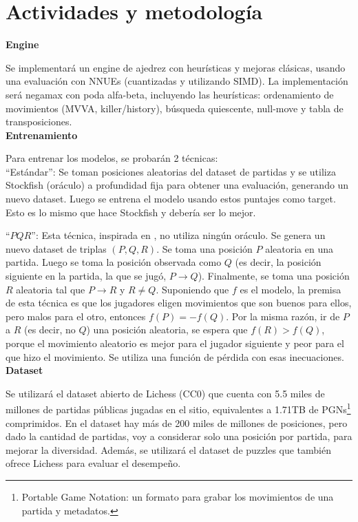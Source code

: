 \newpage
\section*{Actividades y metodología}

\textbf{Engine}

Se implementará un engine de ajedrez con heurísticas y mejoras clásicas, usando una evaluación con NNUEs (cuantizadas y utilizando SIMD). La implementación será negamax con poda alfa-beta, incluyendo las heurísticas: ordenamiento de movimientos (MVVA, killer/history), búsqueda quiescente, null-move y tabla de transposiciones. \\

\textbf{Entrenamiento}

Para entrenar los modelos, se probarán 2 técnicas: \\

``Estándar'': Se toman posiciones aleatorias del dataset de partidas y se utiliza Stockfish (oráculo) a profundidad fija para obtener una evaluación, generando un nuevo dataset. Luego se entrena el modelo usando estos puntajes como target. Esto es lo mismo que hace Stockfish y debería ser lo mejor.

``$PQR$'': Esta técnica, inspirada en \cite{dlchess:2014}, no utiliza ningún oráculo. Se genera un nuevo dataset de triplas $(P,Q,R)$. Se toma una posición $P$ aleatoria en una partida. Luego se toma la posición observada como $Q$ (es decir, la posición siguiente en la partida, la que se jugó, $P \rightarrow Q$). Finalmente, se toma una posición $R$ aleatoria tal que $P \rightarrow R$ y $R \neq Q$. Suponiendo que $f$ es el modelo, la premisa de esta técnica es que los jugadores eligen movimientos que son buenos para ellos, pero malos para el otro, entonces $f(P)=-f(Q)$. Por la misma razón, ir de $P$ a $R$ (es decir, no $Q$) una posición aleatoria, se espera que $f(R) > f(Q)$, porque el movimiento aleatorio es mejor para el jugador siguiente y peor para el que hizo el movimiento. Se utiliza una función de pérdida con esas inecuaciones. \\


\textbf{Dataset}

Se utilizará el dataset abierto de Lichess \cite{lichessdb} (CC0) que cuenta con 5.5 miles de millones de partidas públicas jugadas en el sitio, equivalentes a 1.71TB de PGNs\footnote[1]{Portable Game Notation: un formato para grabar los movimientos de una partida y metadatos.} comprimidos. En el dataset hay más de 200 miles de millones de posiciones, pero dado la cantidad de partidas, voy a considerar solo una posición por partida, para mejorar la diversidad. Además, se utilizará el dataset de puzzles que también ofrece Lichess para evaluar el desempeño.

